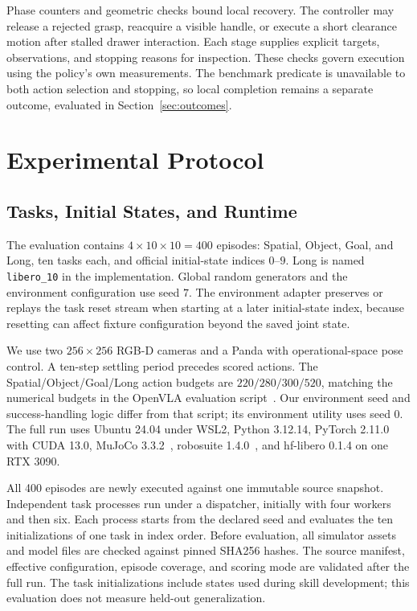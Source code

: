 \documentclass[letterpaper,10pt,conference]{ieeeconf}
\begin{document}
Phase counters and geometric checks bound local recovery. The controller may
release a rejected grasp, reacquire a visible handle, or execute a short
clearance motion after stalled drawer interaction. Each stage supplies
explicit targets, observations, and stopping reasons for inspection. These
checks govern execution using the policy's own measurements. The benchmark
predicate is unavailable to both action selection and stopping, so local
completion remains a separate outcome, evaluated in
Section~\ref{sec:outcomes}.

\section{Experimental Protocol}
\label{sec:protocol}
\subsection{Tasks, Initial States, and Runtime}
The evaluation contains $4\times10\times10=400$ episodes:
Spatial, Object, Goal, and Long, ten tasks each, and official initial-state
indices $0$--$9$. Long is named \texttt{libero\_10} in the implementation.
Global random generators and the environment configuration use seed $7$.
The environment adapter preserves or replays the task reset stream when
starting at a later initial-state index, because resetting can affect fixture
configuration beyond the saved joint state.

We use two $256\times256$ RGB-D cameras and a Panda with operational-space
pose control. A ten-step settling period precedes scored actions. The
Spatial/Object/Goal/Long action budgets are $220/280/300/520$, matching
the numerical budgets in the OpenVLA evaluation script~\cite{openvlacode}.
Our environment seed and success-handling logic differ from that script;
its environment utility uses seed $0$.
The full run uses Ubuntu 24.04 under WSL2, Python 3.12.14,
PyTorch 2.11.0 with CUDA 13.0, MuJoCo 3.3.2~\cite{mujoco},
robosuite 1.4.0~\cite{robosuite}, and hf-libero 0.1.4 on one RTX 3090.

All 400 episodes are newly executed against one immutable source snapshot.
Independent task processes run under a dispatcher, initially with four
workers and then six. Each process starts from the declared seed and evaluates
the ten initializations of one task in index order. Before evaluation, all
simulator assets and model files are checked against pinned SHA256 hashes.
The source manifest, effective configuration, episode coverage, and scoring
mode are validated after the full run. The task initializations include
states used during skill development; this evaluation does not measure
held-out generalization.
\end{document}
